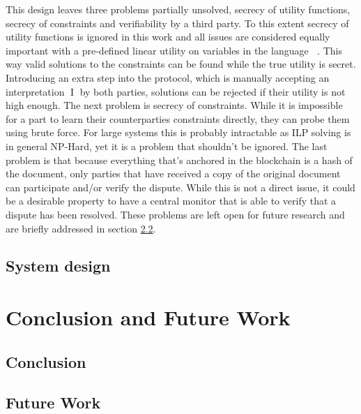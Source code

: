 \documentclass[12pt,msc,a4paper,oneside]{ucl_thesis}
\DeclareMathOperator{\Proplang}{\mathcal{L}(N)}
\DeclareMathOperator{\Interpretation}{I}
\begin{document}
This design leaves three problems partially unsolved, secrecy of utility functions, secrecy of constraints and verifiability by a third party. To this extent secrecy of utility functions is ignored in this work and all issues are considered equally important with a pre-defined linear utility on variables in the language $\Proplang$. This way valid solutions to the constraints can be found while the true utility is secret. Introducing an extra step into the protocol, which is manually accepting an interpretation $\Interpretation$ by both parties, solutions can be rejected if their utility is not high enough. The next problem is secrecy of constraints. While it is impossible for a part to learn their counterparties constraints directly, they can probe them using brute force. For large systems this is probably intractable as ILP solving is in general NP-Hard, yet it is a problem that shouldn't be ignored. The last problem is that because everything that's anchored in the blockchain is a hash of the document, only parties that have received a copy of the original document can participate and/or verify the dispute. While this is not a direct issue, it could be a desirable property to have a central monitor that is able to verify that a dispute has been resolved. These problems are left open for future research and are briefly addressed in section \ref{sec:future_work}.


\section{System design}

\chapter{Conclusion and Future Work}

\section{Conclusion} \label{sec:conclusion}

\section{Future Work} \label{sec:future_work}





\end{document}

